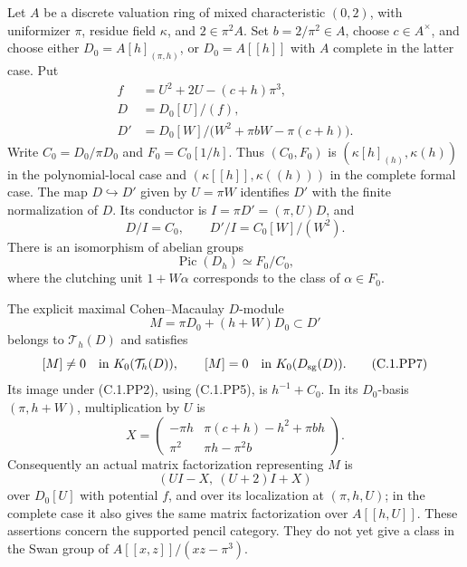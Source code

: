 \begin{proposition}
\label{C:ramified-pencil-supported-Picard}
Let $A$ be a discrete valuation ring of mixed
characteristic $(0,2)$, with uniformizer $\pi$, residue field
$\kappa$, and $2\in\pi^2A$.
Set $b=2/\pi^2\in A$, choose $c\in A^\times$, and choose
either $D_0=A[h]_{(\pi,h)}$, or $D_0=A[[h]]$ with $A$
complete in the latter case.  Put
\[
 \begin{split}
 f&=U^2+2U-(c+h)\pi^3,\\
 D&=D_0[U]/(f),\\
 D'&=D_0[W]/
       \bigl(W^2+\pi bW-\pi(c+h)\bigr).
 \end{split}                                                   \tag{C.1.PP3}
\]
Write $C_0=D_0/\pi D_0$ and $F_0=C_0[1/h]$.
Thus $(C_0,F_0)$ is $(\kappa[h]_{(h)},\kappa(h))$ in the
polynomial-local case and $(\kappa[[h]],\kappa((h)))$ in
the complete formal case.
The map $D\hookrightarrow D'$ given by $U=\pi W$ identifies
$D'$ with the finite normalization of $D$.
Its conductor is $I=\pi D'=(\pi,U)D$, and
\[
 D/I=C_0,\qquad D'/I=C_0[W]/(W^2).                  \tag{C.1.PP4}
\]
There is an isomorphism of abelian groups
\[
 \operatorname{Pic}(D_h)
       \simeq F_0/C_0,                              \tag{C.1.PP5}
\]
where the clutching unit $1+W\alpha$ corresponds to the class
of $\alpha\in F_0$.

The explicit maximal Cohen--Macaulay $D$-module
\[
                  M=\pi D_0+(h+W)D_0\subset D'       \tag{C.1.PP6}
\]
belongs to $\mathcal T_h(D)$ and satisfies
\[
 [M]\ne0\quad\hbox{in }K_0(\mathcal T_h(D)),
 \qquad [M]=0\quad\hbox{in }K_0(D_{\rm sg}(D)).       \tag{C.1.PP7}
\]
Its image under (C.1.PP2), using (C.1.PP5), is
$h^{-1}+C_0$.
In its $D_0$-basis $(\pi,h+W)$, multiplication by $U$ is
\[
 X=\begin{pmatrix}
 -\pi h&\pi(c+h)-h^2+\pi b h\\
 \pi^2&\pi h-\pi^2b
 \end{pmatrix}.                                      \tag{C.1.PP8}
\]
Consequently an actual matrix factorization representing $M$ is
\[
       (UI-X,\ (U+2)I+X)                             \tag{C.1.PP9}
\]
over $D_0[U]$ with potential $f$, and over its localization
at $(\pi,h,U)$; in the complete case it also gives the
same matrix factorization over $A[[h,U]]$.
These assertions concern the supported pencil category.
They do not yet give a class in the Swan group of
$A[[x,z]]/(xz-\pi^3)$.
\end{proposition}
